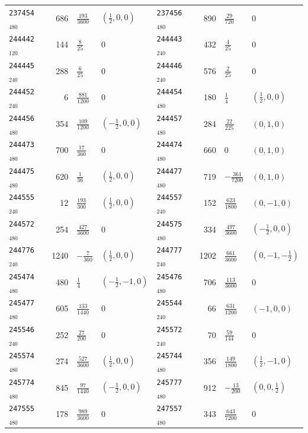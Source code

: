 {\begin{longtable}{@{}lrll@{\hspace{2em}}lrll@{}}
\texttt{237454}$_{480}$ & 686 & $\tfrac{193}{3600}$ & $(\tfrac{1}{2},0,0)$ & \texttt{237456}$_{480}$ & 890 & $\tfrac{29}{720}$ & 0\\
\texttt{244442}$_{120}$ & 144 & $\tfrac{8}{25}$ & 0 & \texttt{244443}$_{240}$ & 432 & $\tfrac{4}{25}$ & 0\\
\texttt{244445}$_{240}$ & 288 & $\tfrac{6}{25}$ & 0 & \texttt{244446}$_{240}$ & 576 & $\tfrac{2}{25}$ & 0\\
\texttt{244452}$_{240}$ & 6 & $\tfrac{881}{1200}$ & 0 & \texttt{244454}$_{480}$ & 180 & $\tfrac{1}{4}$ & $(\tfrac{1}{2},0,0)$\\
\texttt{244456}$_{480}$ & 354 & $\tfrac{109}{1200}$ & $(-\tfrac{1}{2},0,0)$ & \texttt{244457}$_{480}$ & 284 & $\tfrac{22}{225}$ & $(0,1,0)$\\
\texttt{244473}$_{480}$ & 700 & $\tfrac{17}{360}$ & 0 & \texttt{244474}$_{480}$ & 660 & $0$ & $(0,1,0)$\\
\texttt{244475}$_{480}$ & 620 & $\tfrac{1}{36}$ & $(\tfrac{1}{2},0,0)$ & \texttt{244477}$_{480}$ & 719 & $-\tfrac{361}{7200}$ & $(0,1,0)$\\
\texttt{244555}$_{240}$ & 12 & $\tfrac{193}{300}$ & $(\tfrac{1}{2},0,0)$ & \texttt{244557}$_{240}$ & 152 & $\tfrac{623}{1800}$ & $(0,-1,0)$\\
\texttt{244572}$_{480}$ & 254 & $\tfrac{427}{3600}$ & 0 & \texttt{244575}$_{480}$ & 334 & $\tfrac{497}{3600}$ & $(-\tfrac{1}{2},0,0)$\\
\texttt{244776}$_{240}$ & 1240 & $-\tfrac{7}{360}$ & $(\tfrac{1}{2},0,0)$ & \texttt{244777}$_{240}$ & 1202 & $\tfrac{661}{3600}$ & $(0,-1,-\tfrac{1}{2})$\\
\texttt{245474}$_{480}$ & 480 & $\tfrac{1}{4}$ & $(-\tfrac{1}{2},-1,0)$ & \texttt{245476}$_{480}$ & 706 & $\tfrac{113}{3600}$ & 0\\
\texttt{245477}$_{480}$ & 605 & $\tfrac{133}{1440}$ & 0 & \texttt{245544}$_{240}$ & 66 & $\tfrac{631}{1200}$ & $(-1,0,0)$\\
\texttt{245546}$_{240}$ & 252 & $\tfrac{27}{200}$ & 0 & \texttt{245572}$_{240}$ & 70 & $\tfrac{59}{144}$ & 0\\
\texttt{245574}$_{480}$ & 274 & $\tfrac{527}{3600}$ & $(\tfrac{1}{2},0,0)$ & \texttt{245744}$_{480}$ & 356 & $\tfrac{149}{1800}$ & $(\tfrac{1}{2},-1,0)$\\
\texttt{245774}$_{480}$ & 845 & $\tfrac{97}{1440}$ & $(-\tfrac{1}{2},0,0)$ & \texttt{245777}$_{480}$ & 912 & $-\tfrac{13}{200}$ & $(0,0,\tfrac{1}{2})$\\
\texttt{247555}$_{480}$ & 178 & $\tfrac{989}{3600}$ & 0 & \texttt{247557}$_{480}$ & 343 & $\tfrac{643}{7200}$ & 0\\

\end{longtable}}
